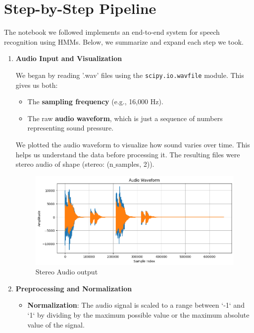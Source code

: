 \documentclass[informe,english]{practicaitic}
\begin{document}
\section{Step-by-Step Pipeline}
    
    The notebook we followed implements an end-to-end system for speech recognition using HMMs. Below, we summarize and expand each step we took.
    
\begin{enumerate}
        \item \textbf{Audio Input and Visualization}
        
    We began by reading '.wav' files using the \texttt{scipy.io.wavfile} module. This gives us both:
    \begin{itemize}
        \item The \textbf{sampling frequency} (e.g., 16,000 Hz).
        \item The raw \textbf{audio waveform}, which is just a sequence of numbers representing sound pressure.
    \end{itemize}
    
    We plotted the audio waveform to visualize how sound varies over time. This helps us understand the data before processing it. The resulting files were stereo audio of shape (stereo: (n$\_$samples, 2)).

    \begin{figure}[h!]
        \centering
        \includegraphics[width=1.0\linewidth]{img/stereo.png}
        \caption{Stereo Audio output}
        \label{fig:enter-label}
    \end{figure}
    
    \item \textbf{Preprocessing and Normalization}
    
    \begin{itemize}
    
        \item \textbf{Normalization}: The audio signal is scaled to a range between `-1` and `1` by dividing by the maximum possible value or the maximum absolute value of the signal.
        

\end{itemize}
\end{enumerate}
\end{document}
